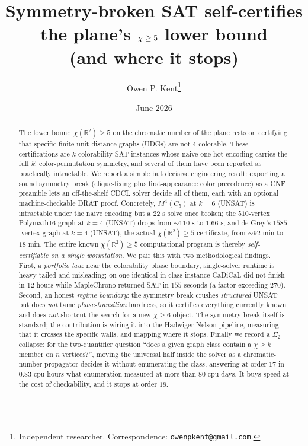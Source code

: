 \documentclass[11pt]{article}
\title{Symmetry-broken SAT self-certifies the plane's
  $\chrom \ge 5$ lower bound\\(and where it stops)}
\author{Owen P. Kent\thanks{Independent researcher.
  Correspondence: \texttt{owenpkent@gmail.com}.}}
\date{June 2026}
\theoremstyle{definition}
\newcommand{\R}{\mathbb{R}}
\newcommand{\chrom}{\chi}
\begin{document}
\maketitle

\begin{abstract}
The lower bound $\chrom(\R^2) \ge 5$ on the chromatic number of the plane rests
on certifying that specific finite unit-distance graphs (UDGs) are not
$4$-colorable. These certifications are $k$-colorability SAT instances whose
naive one-hot encoding carries the full $k!$ color-permutation symmetry, and
several of them have been reported as practically intractable. We report a simple
but decisive engineering result: exporting a sound symmetry break (clique-fixing
plus first-appearance color precedence) as a CNF preamble lets an off-the-shelf
CDCL solver decide all of them, each with an optional machine-checkable DRAT
proof. Concretely, $M^4(C_5)$ at $k=6$ (UNSAT) is intractable under the naive
encoding but a $22$ s solve once broken; the $510$-vertex Polymath16 graph at
$k=4$ (UNSAT) drops from $\sim\!110$ s to $1.66$ s; and de Grey's $1585$-vertex
graph at $k=4$ (UNSAT), the actual $\chrom(\R^2) \ge 5$ certificate, from
$\sim\!92$ min to $18$ min. The entire known
$\chrom(\R^2) \ge 5$ computational program is thereby \emph{self-certifiable on a
single workstation}. We pair this with two methodological findings. First, a
\emph{portfolio law}: near the colorability phase boundary, single-solver runtime
is heavy-tailed and misleading; on one identical in-class instance CaDiCaL did not
finish in $12$ hours while MapleChrono returned SAT in $155$ seconds (a factor
exceeding $270$). Second, an honest \emph{regime boundary}: the symmetry
break crushes \emph{structured} UNSAT but does \emph{not} tame
\emph{phase-transition} hardness, so it certifies everything currently known and
does \emph{not} shortcut the search for a new $\chrom \ge 6$ object. The symmetry
break itself is standard; the contribution is wiring it into the
Hadwiger-Nelson pipeline, measuring that it crosses the specific walls, and
mapping where it stops. Finally we record a $\Sigma_2$ collapse: for the
two-quantifier question ``does a given graph class contain a $\chrom \ge k$
member on $n$ vertices?'', moving the universal half inside the solver as a
chromatic-number propagator decides it without enumerating the class, answering
at order $17$ in $0.83$ cpu-hours what enumeration measured at more than $80$
cpu-days. It buys speed at the cost of checkability, and it stops at order $18$.
\end{abstract}
\end{document}
